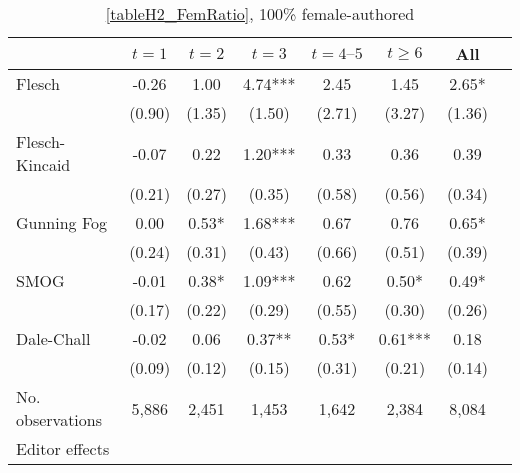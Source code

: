 \begin{table}
    \footnotesize
    \centering
    \begin{threeparttable}
        \caption{\autoref{tableH2_FemRatio}, 100\% female-authored}
        \label{tableH2_Fem100}
        \begin{tabular}{p{3cm}S@{}S@{}S@{}S@{}S@{}S@{}S@{}}
            \toprule
            &{\(t=1\)}&{\(t=2\)}&{\(t=3\)}&{\(t=4\text{--}5\)}&{\(t\ge6\)}&{All}\\
            \midrule
            Flesch                        &       -0.26   &        1.00   &        4.74***&        2.45   &        1.45   &        2.65*  \\
                                          &      (0.90)   &      (1.35)   &      (1.50)   &      (2.71)   &      (3.27)   &      (1.36)   \\
            Flesch-Kincaid                &       -0.07   &        0.22   &        1.20***&        0.33   &        0.36   &        0.39   \\
                                          &      (0.21)   &      (0.27)   &      (0.35)   &      (0.58)   &      (0.56)   &      (0.34)   \\
            Gunning Fog                   &        0.00   &        0.53*  &        1.68***&        0.67   &        0.76   &        0.65*  \\
                                          &      (0.24)   &      (0.31)   &      (0.43)   &      (0.66)   &      (0.51)   &      (0.39)   \\
            SMOG                          &       -0.01   &        0.38*  &        1.09***&        0.62   &        0.50*  &        0.49*  \\
                                          &      (0.17)   &      (0.22)   &      (0.29)   &      (0.55)   &      (0.30)   &      (0.26)   \\
            Dale-Chall                    &       -0.02   &        0.06   &        0.37** &        0.53*  &        0.61***&        0.18   \\
                                          &      (0.09)   &      (0.12)   &      (0.15)   &      (0.31)   &      (0.21)   &      (0.14)   \\
            \midrule
            No. observations              &       5,886   &       2,451   &       1,453   &       1,642   &       2,384   &       8,084   \\
            \midrule
            Editor effects       &           {}   &           {}   &           {}   &           {}   &           {}   &           {}   \\

\end{tabular}
\end{threeparttable}
\end{table}
